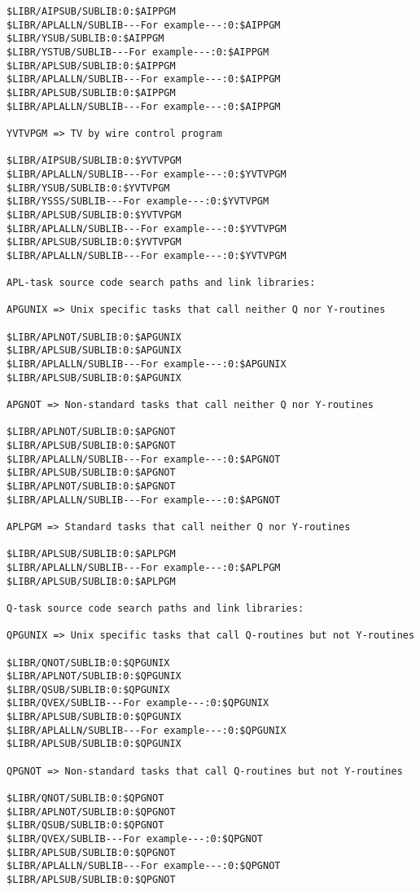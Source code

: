 \begin{verbatim}
$LIBR/AIPSUB/SUBLIB:0:$AIPPGM
$LIBR/APLALLN/SUBLIB---For example---:0:$AIPPGM
$LIBR/YSUB/SUBLIB:0:$AIPPGM
$LIBR/YSTUB/SUBLIB---For example---:0:$AIPPGM
$LIBR/APLSUB/SUBLIB:0:$AIPPGM
$LIBR/APLALLN/SUBLIB---For example---:0:$AIPPGM
$LIBR/APLSUB/SUBLIB:0:$AIPPGM
$LIBR/APLALLN/SUBLIB---For example---:0:$AIPPGM

YVTVPGM => TV by wire control program

$LIBR/AIPSUB/SUBLIB:0:$YVTVPGM
$LIBR/APLALLN/SUBLIB---For example---:0:$YVTVPGM
$LIBR/YSUB/SUBLIB:0:$YVTVPGM
$LIBR/YSSS/SUBLIB---For example---:0:$YVTVPGM
$LIBR/APLSUB/SUBLIB:0:$YVTVPGM
$LIBR/APLALLN/SUBLIB---For example---:0:$YVTVPGM
$LIBR/APLSUB/SUBLIB:0:$YVTVPGM
$LIBR/APLALLN/SUBLIB---For example---:0:$YVTVPGM

APL-task source code search paths and link libraries:

APGUNIX => Unix specific tasks that call neither Q nor Y-routines

$LIBR/APLNOT/SUBLIB:0:$APGUNIX
$LIBR/APLSUB/SUBLIB:0:$APGUNIX
$LIBR/APLALLN/SUBLIB---For example---:0:$APGUNIX
$LIBR/APLSUB/SUBLIB:0:$APGUNIX

APGNOT => Non-standard tasks that call neither Q nor Y-routines

$LIBR/APLNOT/SUBLIB:0:$APGNOT
$LIBR/APLSUB/SUBLIB:0:$APGNOT
$LIBR/APLALLN/SUBLIB---For example---:0:$APGNOT
$LIBR/APLSUB/SUBLIB:0:$APGNOT
$LIBR/APLNOT/SUBLIB:0:$APGNOT
$LIBR/APLALLN/SUBLIB---For example---:0:$APGNOT

APLPGM => Standard tasks that call neither Q nor Y-routines

$LIBR/APLSUB/SUBLIB:0:$APLPGM
$LIBR/APLALLN/SUBLIB---For example---:0:$APLPGM
$LIBR/APLSUB/SUBLIB:0:$APLPGM

Q-task source code search paths and link libraries:

QPGUNIX => Unix specific tasks that call Q-routines but not Y-routines

$LIBR/QNOT/SUBLIB:0:$QPGUNIX
$LIBR/APLNOT/SUBLIB:0:$QPGUNIX
$LIBR/QSUB/SUBLIB:0:$QPGUNIX
$LIBR/QVEX/SUBLIB---For example---:0:$QPGUNIX
$LIBR/APLSUB/SUBLIB:0:$QPGUNIX
$LIBR/APLALLN/SUBLIB---For example---:0:$QPGUNIX
$LIBR/APLSUB/SUBLIB:0:$QPGUNIX

QPGNOT => Non-standard tasks that call Q-routines but not Y-routines

$LIBR/QNOT/SUBLIB:0:$QPGNOT
$LIBR/APLNOT/SUBLIB:0:$QPGNOT
$LIBR/QSUB/SUBLIB:0:$QPGNOT
$LIBR/QVEX/SUBLIB---For example---:0:$QPGNOT
$LIBR/APLSUB/SUBLIB:0:$QPGNOT
$LIBR/APLALLN/SUBLIB---For example---:0:$QPGNOT
$LIBR/APLSUB/SUBLIB:0:$QPGNOT


\end{verbatim}
